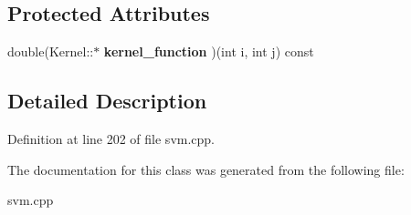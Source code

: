 \subsection*{Protected Attributes}
\begin{DoxyCompactItemize}
\item 
\hypertarget{class_kernel_a575eeb588e8a5c62ff3228a35e255a02}{
double(Kernel::$\ast$ {\bfseries kernel\_\-function} )(int i, int j) const }
\label{class_kernel_a575eeb588e8a5c62ff3228a35e255a02}

\end{DoxyCompactItemize}


\subsection{Detailed Description}


Definition at line 202 of file svm.cpp.



The documentation for this class was generated from the following file:\begin{DoxyCompactItemize}
\item 
svm.cpp\end{DoxyCompactItemize}
